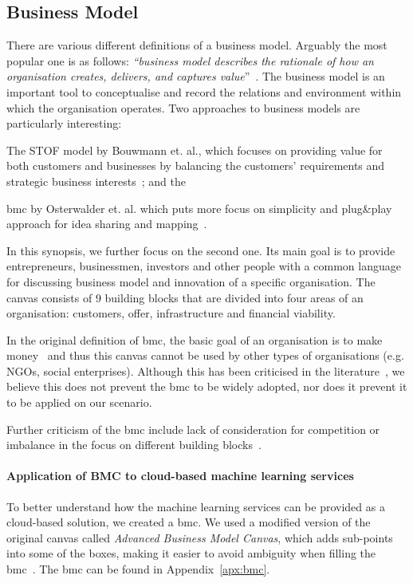 \subsection{Business Model}\label{sec:business-model}

There are various different definitions of a business model. Arguably the most popular one is as follows: \textit{``business model describes the rationale of how an organisation creates, delivers, and captures value}''~\cite{Osterwalder2010BusinessChallengers}. The business model is an important tool to conceptualise and record the relations and environment within which the organisation operates. Two approaches to business models are particularly interesting:
\begin{enumerate*}[label=(\roman*)] 
    \item The STOF model by Bouwmann et. al., which focuses on providing value for both customers and businesses by balancing the customers' requirements and strategic business interests~\cite{Bouwman2008ServiceModels}; and the
    \item \acrfull{bmc} by Osterwalder et. al. which puts more focus on simplicity and plug\&play approach for idea sharing and mapping~\cite{Hong2013CriticismsCanvas}.
\end{enumerate*}
 
In this synopsis, we further focus on the second one. Its main goal is to provide entrepreneurs, businessmen, investors and other people with a common language for discussing business model and innovation of a specific organisation. The canvas consists of 9 building blocks that are divided into four areas of an organisation: customers, offer, infrastructure and financial viability.

In the original definition of \acrshort{bmc}, the basic goal of an organisation is to make money~\cite[p. 21]{Osterwalder2010BusinessChallengers} and thus this canvas cannot be used by other types of organisations (e.g. NGOs, social enterprises). Although this has been criticised in the literature~\cite{Hong2013CriticismsCanvas}, we believe this does not prevent the \acrshort{bmc} to be widely adopted, nor does it prevent it to be applied on our scenario.

Further criticism of the \acrshort{bmc} include lack of consideration for competition or imbalance in the focus on different building blocks~\cite{Hong2013CriticismsCanvas}.

\paragraph{Application of BMC to cloud-based machine learning services}
To better understand how the machine learning services can be provided as a cloud-based solution, we created a \acrshort{bmc}. We used a modified version of the original canvas called \textit{Advanced Business Model Canvas}, which adds sub-points into some of the boxes, making it easier to avoid ambiguity when filling the \acrshort{bmc}~\cite{King2017BusinessInstructions, Hong2013CriticismsCanvas}. The \acrshort{bmc} can be found in Appendix~\ref{apx:bmc}.

